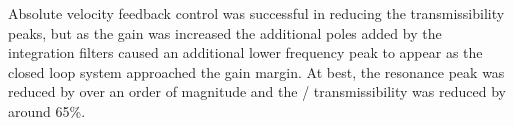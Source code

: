 \documentclass[11pt,a4paper]{memoir}
\begin{document}
Absolute velocity feedback control was successful in reducing the transmissibility peaks, but as the gain was increased the additional poles added by the integration filters caused an additional lower frequency peak to appear as the closed loop system approached the gain margin.
At best, the resonance peak was reduced by over an order of magnitude and the \RSS/ transmissibility was reduced by around 65\%.
\end{document}
